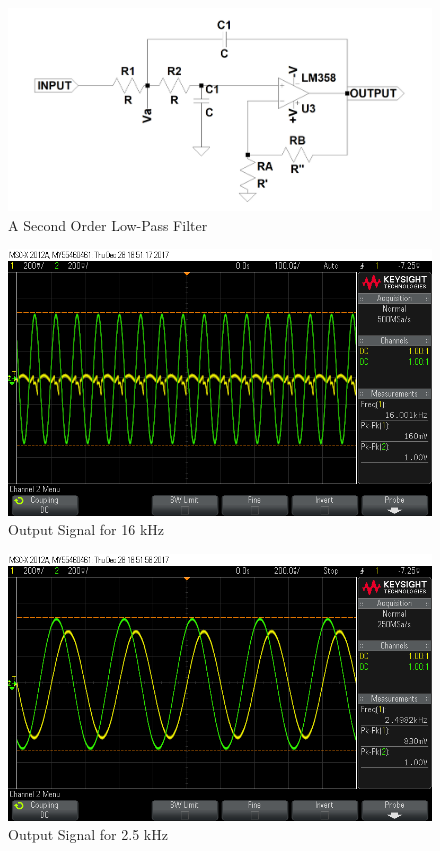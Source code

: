 \documentclass[paper]{IEEEtran}
\begin{document}
\begin{figure}[h!]
	\setlength{\unitlength}{\textwidth}
	\center 
	\includegraphics[width=0.5\unitlength]{solpf.png}
	\caption{\label{fig:lpf}A Second Order Low-Pass Filter }
\end{figure} 
	


\begin{figure}[h!]
	\setlength{\unitlength}{\textwidth}
	\center 
	\includegraphics[width=0.45\unitlength]{filt_osc2.png}
	\caption{\label{fig:lpfvo1}Output Signal for 16 kHz}
\end{figure} 
	

\begin{figure}[h!]
	\setlength{\unitlength}{\textwidth}
	\center 
	\includegraphics[width=0.45\unitlength]{filt_osc4.png}
	\caption{\label{fig:lpfvo2}Output Signal for 2.5 kHz}
\end{figure} 
	
\end{document}
